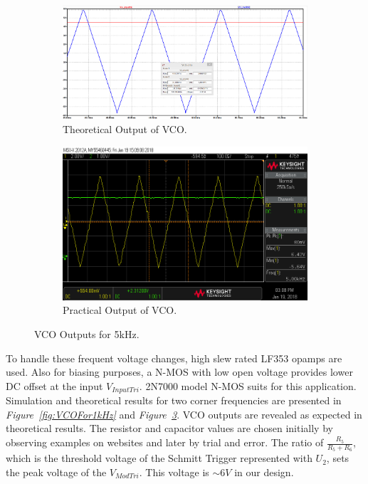 \documentclass[paper]{IEEEtran}
\begin{document}
\begin{figure}[t!]
	\centering
	\begin{subfigure}{.48\textwidth}
		\centering
		\includegraphics[width=1\linewidth]{scope_24_SimResult}
		\caption{Theoretical Output of VCO.}
		\label{fig:VCOFor5kHzTheoretical}
	\end{subfigure}%
	\newline
	\begin{subfigure}{.48\textwidth}
		\centering
		\includegraphics[width=1\linewidth]{scope_24}
		\caption{Practical Output of VCO.}
		\label{fig:VCOFor5kHzPractical}
	\end{subfigure}
	\caption{VCO Outputs for 5kHz.}
	\label{fig:VCOFor5kHz}
\end{figure}
To handle these frequent voltage changes, high slew rated LF353\cite{b2} opamps are used. Also for biasing purposes, a N-MOS with low open voltage provides lower DC offset at the input $V_{InputTri}$. 2N7000\cite{b3} model N-MOS suits for this application. Simulation and theoretical results for two corner frequencies are presented in \textit{Figure~\ref{fig:VCOFor1kHz}} and \textit{Figure~\ref{fig:VCOFor5kHz}}. VCO outputs are revealed as expected in theoretical results. The resistor and capacitor values are chosen initially by observing examples on websites\cite{b4} and later by trial and error. The ratio of $\frac{R_{5}}{R_{5}+R_{6}}$, which is the threshold voltage of the Schmitt Trigger represented with $U_{2}$, sets the peak voltage of the $V_{ModTri}$. This voltage is $\sim6V$ in our design.
\end{document}
